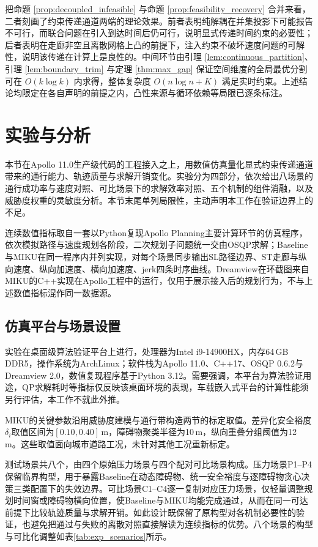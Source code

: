 \documentclass[a4paper,11pt]{ctexart}
\theoremstyle{definition}
\begin{document}
把命题 \ref{prop:decoupled_infeasible} 与命题 \ref{prop:feasibility_recovery} 合并来看，二者刻画了约束传递通道两端的理论效果。前者表明纯解耦在并集投影下可能报告不可行，而联合问题在引入到达时间后仍可行，说明显式传递时间约束的必要性；后者表明在走廊非空且离散网格上凸的前提下，注入约束不破坏速度问题的可解性，说明该传递在计算上是良性的。中间环节由引理 \ref{lem:continuous_partition}、引理 \ref{lem:boundary_trim} 与定理 \ref{thm:max_gap} 保证空间维度的全局最优分割可在 $O(k \log k)$ 内求得，整体复杂度 $O(n \log n + K)$ 满足实时约束。上述结论均限定在各自声明的前提之内，凸性来源与循环依赖等局限已逐条标注。

\section{实验与分析}
\label{sec:experiment}

本节在Apollo 11.0生产级代码的工程接入之上，用数值仿真量化显式约束传递通道带来的通行能力、轨迹质量与求解开销变化。实验分为四部分，依次给出八场景的通行成功率与速度对照、可比场景下的求解效率对照、五个机制的组件消融，以及威胁度权重的灵敏度分析。本节末尾单列局限性，主动声明本工作在验证边界上的不足。

连续数值指标取自一套以Python复现Apollo Planning主要计算环节的仿真程序，依次模拟路径与速度规划各阶段，二次规划子问题统一交由OSQP求解；Baseline与MIKU在同一程序内并列实现，对每个场景同步输出SL路径边界、ST走廊与纵向速度、纵向加速度、横向加速度、jerk四条时序曲线。Dreamview在环截图来自MIKU的C++实现在Apollo工程中的运行，仅用于展示接入后的规划行为，不与上述数值指标混作同一数据源。

\subsection{仿真平台与场景设置}
\label{subsec:exp_setup}

实验在桌面级算法验证平台上进行，处理器为Intel i9-14900HX，内存64\,GB DDR5，操作系统为ArchLinux；软件栈为Apollo 11.0、C++17、OSQP 0.6.2与Dreamview 2.0，数值复现程序基于Python 3.12。需要强调，本平台为算法验证用途，QP求解耗时等指标仅反映该桌面环境的表现，车载嵌入式平台的计算性能须另行评估，本工作不就此外推。

MIKU的关键参数沿用威胁度建模与通行带构造两节的标定取值。差异化安全裕度$\delta_i$取值区间为$[0.10, 0.40]$\,m，障碍物聚类半径为10\,m，纵向重叠分组阈值为12\,m。这些取值面向城市道路工况，未针对其他工况重新标定。

测试场景共八个，由四个原始压力场景与四个配对可比场景构成。压力场景P1--P4保留临界构型，用于暴露Baseline在动态障碍物、统一安全裕度与逐障碍物贪心决策三类配置下的失效边界。可比场景C1--C4逐一复制对应压力场景，仅轻量调整规划时间窗或障碍物横向位置，使Baseline与MIKU均能完成通过，从而在同一可达前提下比较轨迹质量与求解开销。如此设计既保留了原构型对各机制必要性的验证，也避免把通过与失败的离散对照直接解读为连续指标的优势。八个场景的构型与可比化调整如表\ref{tab:exp_scenarios}所示。
\end{document}

